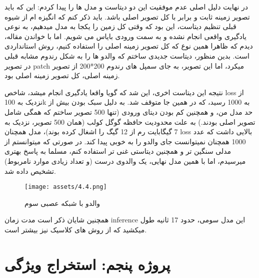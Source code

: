 \documentclass[a4paper,12pt]{article}
\begin{document}
در نهایت دلیل اصلی عدم موفقیت این دو دیتاست و مدل ها را پیدا کردم: این که باید تصویر زمینه ثابت و برابر با کل تصویر اصلی باشد. باید ذکر کنم که انگیزه ام از شیوه قبلی تنظیم دیتاست، این بود که وقتی کل زمین را یکجا به مدل میدهیم، به نوعی یادگیری واقعی انجام نشده و به سمت ورودی بایاس می شویم. اما با خواندن مقاله، دیدم که ظاهرا همین نوع که کل تصویر زمینه اصلی را استفاده کنیم، روش استانداردی است. بدین منظور، دیتاست جدیدی  ساختم که والدو ها را به شکل رندوم مشابه قبلی در تصویر patch میکرد، اما این تصویر، به جای سمپل های رندوم 200*200 از تصویر زمینه اصلی، کل تصویر زمینه اصلی بود.

نتیجه این دیتاست اخری، این شد که گویا واقعا یادگیری انجام میشد، شاخص loss از نزدیک به 100k به 1000 رسید، که در همین جا متوقف شد. به دلیل سبک بودن بیش از حد مدل من، و همچنین کم بودن دیتای ورودی (تنها 500 تصویر ساختم که همگی شامل تصویر اصلی بودند.) به علت محدودیت حافظه گوگل کولب (همان 500 تصویر، نزدیک به 7 گیگابایت رم از 12 گیگ را اشغال کرده بوند)، مدل همچنان loss بالایی داشت که عدد 1000 همچنان نمیتوانست جای والدو را به خوبی پیدا کند. در صورتی که میتوانستم از مدلی سنگین تر و همچنین دیتاستی غنی تر استفاده کنم، مسلما به پاسخ بهتری میرسیدم، اما با همین مدل نهایی، یک والدوی درست (و تعداد زیادی موارد نامربوط) تشخیص داده شد.

 \begin{figure}[h]
	\centering
	\texttt{[image: assets/4.4.png]}
	\caption{\textcolor{CustomAccent}{والدو با شبکه عصبی سوم}}
\end{figure}

همچنین شایان ذکر است مدت زمان inference این مدل سومی، حدود 17 ثانیه طول میکشید که از روش های کلاسیک نیز بیشتر است. 


\section{پروژه پنجم: استخراج ویژگی}
\end{document}
